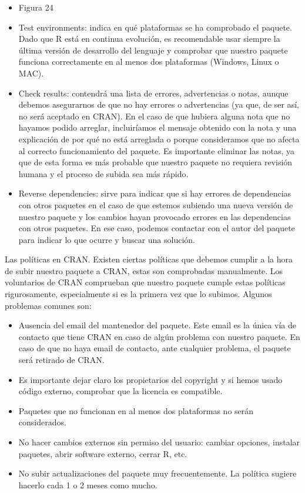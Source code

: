 \begin{itemize}
    \item Figura 24

    \item Test environments: indica en qu\'e plataformas se ha comprobado el paquete. Dado
que R est\'a en continua evoluci\'on, es recomendable usar siempre la \'ultima versi\'on de
desarrollo del lenguaje y comprobar que nuestro paquete funciona correctamente en
al menos dos plataformas (Windows, Linux o MAC).
    \item Check results: contendr\'a una lista de errores, advertencias o notas, aunque debemos
asegurarnos de que no hay errores o advertencias (ya que, de ser as\'i, no ser\'a
aceptado en CRAN).
En el caso de que hubiera alguna nota que no hayamos podido arreglar, incluir\'iamos
el mensaje obtenido con la nota y una explicaci\'on de por qu\'e no est\'a arreglada o
porque consideramos que no afecta al correcto funcionamiento del paquete.
Es importante eliminar las notas, ya que de esta forma es m\'as probable que nuestro
paquete no requiera revisi\'on humana y el proceso de subida sea m\'as r\'apido.
    \item Reverse dependencies: sirve para indicar que si hay errores de dependencias con
otros paquetes en el caso de que estemos subiendo una nueva versi\'on de nuestro
paquete y los cambios hayan provocado errores en las dependencias con otros
paquetes. En ese caso, podemos contactar con el autor del paquete para indicar lo
que ocurre y buscar una soluci\'on.
\end{itemize}

Las pol\'iticas en CRAN.
Existen ciertas pol\'iticas que debemos cumplir a la hora de subir nuestro paquete a CRAN,
estas son comprobadas manualmente. Los voluntarios de CRAN comprueban que nuestro
paquete cumple estas pol\'iticas rigurosamente, especialmente si es la primera vez que lo
subimos.
Algunos problemas comunes son:
\begin{itemize}
    \item Ausencia del email del mantenedor del paquete. Este email es la \'unica v\'ia de contacto
que tiene CRAN en caso de alg\'un problema con nuestro paquete. En caso de que no
haya email de contacto, ante cualquier problema, el paquete ser\'a retirado de CRAN.
    \item Es importante dejar claro los propietarios del copyright y si hemos usado c\'odigo
externo, comprobar que la licencia es compatible.
    \item Paquetes que no funcionan en al menos dos plataformas no ser\'an considerados.
    \item No hacer cambios externos sin permiso del usuario: cambiar opciones, instalar
paquetes, abrir software externo, cerrar R, etc.
    \item No subir actualizaciones del paquete muy frecuentemente. La pol\'itica sugiere hacerlo
cada 1 o 2 meses como mucho.
\end{itemize}

